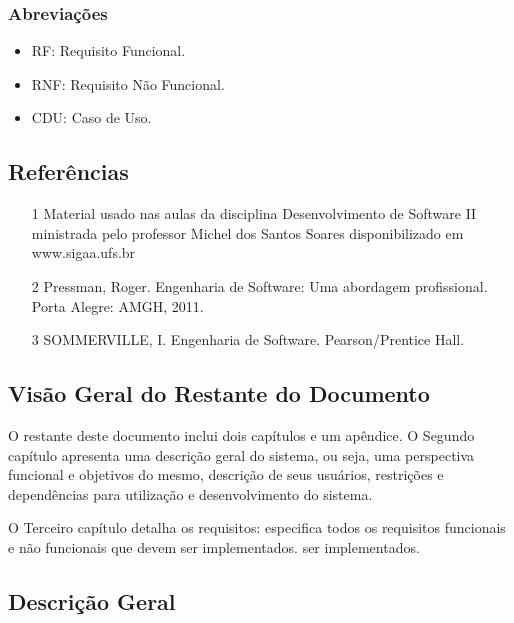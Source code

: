 	\subsubsection{Abreviações}
	\begin{itemize}
	\item RF: Requisito Funcional.
	\item RNF: Requisito Não Funcional.
	\item CDU: Caso de Uso.
	\end{itemize}



\subsection{Referências}

	\begin{itemize}
		\item[1]  Material usado nas aulas da disciplina Desenvolvimento de Software II ministrada pelo professor Michel dos Santos Soares disponibilizado em www.sigaa.ufs.br 
		\item[2] Pressman, Roger. Engenharia de Software: Uma abordagem profissional. Porta Alegre: AMGH, 2011.		
		\item[3] SOMMERVILLE, I. Engenharia de Software. Pearson/Prentice Hall.
	\end{itemize}

\subsection{Visão Geral do Restante do Documento}

\par
O restante deste documento inclui dois capítulos e um apêndice. O Segundo capítulo apresenta uma  descrição geral do sistema, ou seja,  uma  perspectiva funcional e objetivos do mesmo, descrição de seus usuários,   restrições e dependências  para utilização e desenvolvimento do sistema. 
\par
O Terceiro capítulo detalha os requisitos: especifica todos os requisitos funcionais e não funcionais que devem  ser implementados.
 ser implementados.


\subsection{Descrição Geral}

